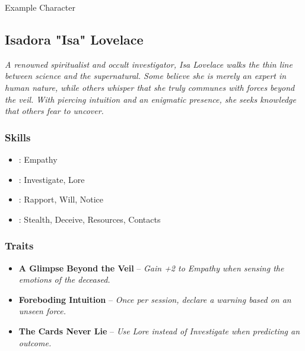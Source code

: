 \begin{DndSidebar}[float=!b]{Example Character}
	\subsection{Isadora "Isa" Lovelace}
	\emph{A renowned spiritualist and occult investigator, Isa Lovelace walks the thin line between science and the supernatural. Some believe she is merely an expert in human nature, while others whisper that she truly communes with forces beyond the veil. With piercing intuition and an enigmatic presence, she seeks knowledge that others fear to uncover.}

	\subsubsection*{Skills}
	\begin{itemize}
    	\item \Expert: Empathy
	    \item \Skilled: Investigate, Lore
    	\item \Novice: Rapport, Will, Notice
	    \item \Untrained: Stealth, Deceive, Resources, Contacts
	\end{itemize}

	\subsubsection*{Traits}
	\begin{itemize}
    	\item \textbf{A Glimpse Beyond the Veil} – \emph{Gain +2 to Empathy when sensing the emotions of the deceased.}
	    \item \textbf{Foreboding Intuition} – \emph{Once per session, declare a warning based on an unseen force.}
    	\item \textbf{The Cards Never Lie} – \emph{Use Lore instead of Investigate when predicting an outcome.}
	\end{itemize}
\end{DndSidebar}
